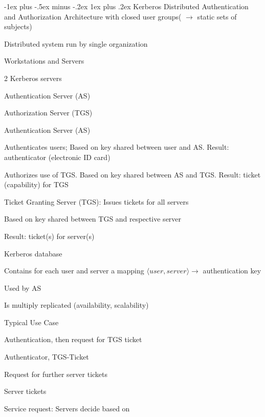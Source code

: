 \documentclass[a4paper]{article}
\makeatletter
\renewcommand{\subsubsection}{\@startsection{subsubsection}{3}{0mm}%
                {-1ex plus -.5ex minus -.2ex}%
                {1ex plus .2ex}%
                {\normalfont\small\bfseries}}
\makeatother
\begin{document}
\begin{multicols}{3}
    \subsubsection{Kerberos}
    Distributed Authentication and Authorization Architecture with closed user groups( $\rightarrow$ static sets of subjects)
    \begin{itemize*}
        \item Distributed system run by single organization
        \item Workstations and Servers
        \item 2 Kerberos servers
        \begin{itemize*}
            \item Authentication Server (AS)
            \item Authorization Server (TGS)
        \end{itemize*}
        \item Authentication Server (AS)
        \begin{itemize*}
            \item Authenticates users; Based on key shared between user and AS. Result: authenticator (electronic ID card)
            \item Authorizes use of TGS. Based on key shared between AS and TGS. Result: ticket (capability) for TGS
        \end{itemize*}
        \item Ticket Granting Server (TGS): Issues tickets for all servers
        \begin{itemize*}
            \item Based on key shared between TGS and respective server
            \item Result: ticket(s) for server(s)
        \end{itemize*}
        \item Kerberos database
        \begin{itemize*}
            \item Contains for each user and server a mapping $\langle user, server\rangle\rightarrow$ authentication key
            \item Used by AS
            \item Is multiply replicated (availability, scalability)
        \end{itemize*}
    \end{itemize*}

    Typical Use Case
    \begin{enumerate*}
        \item Authentication, then request for TGS ticket
        \item Authenticator, TGS-Ticket
        \item Request for further server tickets
        \item Server tickets
        \item Service request: Servers decide based on
    \end{enumerate*}


\end{multicols}
\end{document}
